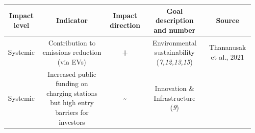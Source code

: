 \documentclass[
]{book}
\begin{document}
\begin{longtable}[]{@{}ccccc@{}}
\toprule
\begin{minipage}[b]{0.17\columnwidth}\centering
Impact level\strut
\end{minipage} & \begin{minipage}[b]{0.16\columnwidth}\centering
Indicator\strut
\end{minipage} & \begin{minipage}[b]{0.17\columnwidth}\centering
Impact direction\strut
\end{minipage} & \begin{minipage}[b]{0.17\columnwidth}\centering
Goal description and number\strut
\end{minipage} & \begin{minipage}[b]{0.17\columnwidth}\centering
Source\strut
\end{minipage}\tabularnewline
\midrule
\endhead
\begin{minipage}[t]{0.17\columnwidth}\centering
Systemic\strut
\end{minipage} & \begin{minipage}[t]{0.16\columnwidth}\centering
Contribution to emissions reduction (via EVs)\strut
\end{minipage} & \begin{minipage}[t]{0.17\columnwidth}\centering
\textbf{+}\strut
\end{minipage} & \begin{minipage}[t]{0.17\columnwidth}\centering
Environmental sustainability (\emph{7,12,13,15})\strut
\end{minipage} & \begin{minipage}[t]{0.17\columnwidth}\centering
Thananusak et al., 2021\strut
\end{minipage}\tabularnewline
\begin{minipage}[t]{0.17\columnwidth}\centering
Systemic\strut
\end{minipage} & \begin{minipage}[t]{0.16\columnwidth}\centering
Increased public funding on charging stations but high entry barriers for investors\strut
\end{minipage} & \begin{minipage}[t]{0.17\columnwidth}\centering
\textbf{\textasciitilde{}}\strut
\end{minipage} & \begin{minipage}[t]{0.17\columnwidth}\centering
Innovation \& Infrastructure (\emph{9})\strut
\end{minipage} & \begin{minipage}[t]{0.17\columnwidth}\centering

\end{minipage}
\end{longtable}
\end{document}
